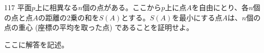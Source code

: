 \begin{prob}{117}{}{}
 平面$p$上に相異なる$n$個の点がある。ここから$p$上に点$A$を自由にとり、各$n$個の点と点$A$の距離の2乗の和を$S(A)$とする。$S(A)$を最小にする点$A$は、$n$個の点の重心 (座標の平均を取った点) であることを証明せよ。
\end{prob}

ここに解答を記述。
